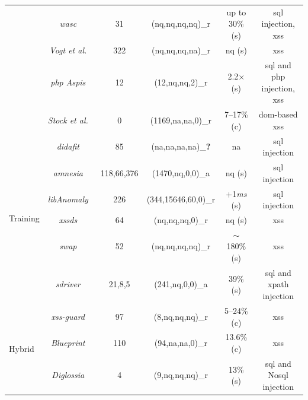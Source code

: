 \documentclass[conference]{IEEEtran}
\newcommand{\xmark}{\ding{56}}
\begin{document}
\begin{landscape}
\begin{table}
\begin{threeparttable}
\begin{small}
{\begin{tabular}{l|c|c|cc|c}
  &  	{\it {\sc wasc}}~\cite{NLC07} & 31 & ({\sc nq},{\sc nq},{\sc nq},{\sc nq})\_r & up to 30\% ({\sc s}) & {\sc sql} injection, {\sc xss} \\
	&  	{\it Vogt et al.}~\cite{VFJKKV07} & 322 & ({\sc nq},{\sc nq},{\sc nq},{\sc na})\_r & {\sc nq} ({\sc s}) & {\sc xss} \\
	&  	{\it {\sc php} Aspis}~\cite{PMP11} & 12 & (12,{\sc nq},{\sc nq},2)\_r & 2.2$\times$ ({\sc s}) & {\sc sql} and {\sc php} injection, {\sc xss} \\
	& 	{\it Stock et al.}~\cite{SLMS14} & 0 & (1169,{\sc na},{\sc na},0)\_r & 7--17\% ({\sc c}) & {\sc dom}-based {\sc xss} \\
	\hline
	\hline  
  \multirow{6}{*}{Training}
  &   {\it {\sc didafit}}~\cite{LLW02} & 85 & ({\sc na},{\sc na},{\sc na},{\sc na})\_{\bf ?} & {\sc na} & {\sc sql} injection \\
	&   {\it {\sc amnesia}}~\cite{HO05,HO06,HO05b} & 118,66,376 & (1470,{\sc nq},0,0)\_a & {\sc nq} ({\sc s}) & {\sc sql} injection \\ 
	&   {\it libAnomaly}~\cite{VMV05} & 226 & (344,15646,60,0)\_r & +1{\it ms} ({\sc s}) & {\sc sql} injection \\
	& 	{\it {\sc xssds}}~\cite{JEP08} & 64 & ({\sc nq},{\sc nq},{\sc nq},0)\_r & {\sc nq} ({\sc s}) & {\sc xss} \\
  & 	{\it {\sc swap}}~\cite{WPLKK09} & 52 & ({\sc nq},{\sc nq},{\sc nq},{\sc nq})\_r & $\sim$180\% ({\sc s}) & {\sc xss} \\ 
	& 	{\it {\sc sd}river}~\cite{MS09,MKS09,MKLS11} & 21,8,5 & (241,{\sc nq},0,0)\_a & 39\% ({\sc s}) & {\sc sql} and {\sc xp}ath injection \\
  \hline
  \hline
  \multirow{3}{*}{Hybrid}
  &   {\it {\sc xss-guard}}~\cite{BV08} & 97 & (8,{\sc nq},{\sc nq},{\sc nq})\_r & 5--24\% ({\sc c}) & {\sc xss} \\
  &   {\it Blueprint}~\cite{LV09} & 110 & (94,{\sc na},{\sc na},0)\_r & 13.6\% ({\sc c}) & {\sc xss} \\
  &   {\it Diglossia}~\cite{SMS13} & 4 & (9,{\sc nq},{\sc nq},{\sc nq})\_r & 13\% ({\sc s}) & {\sc sql} and No{\sc sql} injection \\
	\hline
    \end{tabular}}
    \begin{tablenotes}
	\begin{footnotesize}

\end{footnotesize}
\end{tablenotes}
\end{small}
\end{threeparttable}
\end{table}
\end{landscape}
\end{document}
